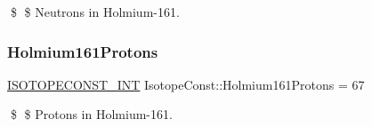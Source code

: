 \$ \$ Neutrons in Holmium-\/161. \mbox{\label{group___isotope_const-_holmium-_ho161_ga947aaffc24646f82c4cae1b30023064f}} 
\subsubsection{\texorpdfstring{Holmium161\+Protons}{Holmium161Protons}}
{\footnotesize\ttfamily \mbox{\hyperlink{group___isotope_const-_macros_ga5f18360b3e99483a35c32d789e62621c}{I\+S\+O\+T\+O\+P\+E\+C\+O\+N\+S\+T\+\_\+\+I\+NT}} Isotope\+Const\+::\+Holmium161\+Protons = 67}

\$ \$ Protons in Holmium-\/161. 